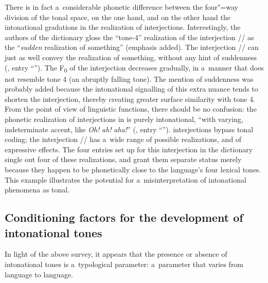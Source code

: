 There is in fact a~considerable phonetic difference between the four"=way division of the 
tonal space, on the one hand, and on the other hand the intonational gradations in the realization of interjections. Interestingly, the
authors of the dictionary gloss the “tone-4” realization of the interjection // as the
“\textit{sudden} realization of something” (emphasis added). The interjection // can just as well
convey the realization of something, without any hint of suddenness (\citealt{lin1972}, entry
“”). The F\textsubscript{0} of the interjection decreases gradually, in a~manner that does not resemble tone
4 (an abruptly falling tone). The mention of suddenness was probably added because the intonational
signalling of this extra nuance tends to shorten the interjection, thereby creating greater surface
similarity with tone 4. From the point of view of linguistic functions, there should be no
confusion: the phonetic realization of interjections in  is purely intonational,
“with varying, indeterminate accent, like  \textit{Oh!} \textit{ah!} \textit{aha!}” (\citealt{lin1972}, entry “”).  interjections bypass tonal coding; the interjection // has
a~wide range of possible realizations, and of expressive effects. The four entries set up for this
interjection in the dictionary single out four of these realizations, and grant them separate status
merely because they happen to be phonetically close to the language’s four lexical tones. This
example illustrates the potential for a~misinterpretation of intonational phenomena as tonal.


\subsection{Conditioning factors for the development of intonational tones}
\label{sec:conclusionaboutthepresenceorabsenceofintonationaltonesasatypologicalparameter}

In light of the above survey, it appears that the presence or absence of intonational tones is
a~typological parameter: a~parameter that varies from language to language.

